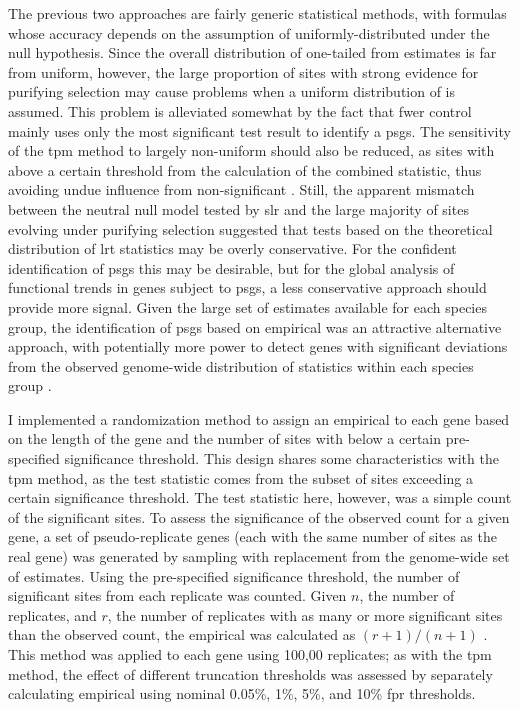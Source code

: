 The previous two approaches are fairly generic statistical methods,
with formulas whose accuracy depends on the assumption of
uniformly-distributed \pvs under the null hypothesis. Since the
overall distribution of one-tailed \pvs from \sw estimates is far
from uniform, however, the large proportion of sites with strong
evidence for purifying selection may cause problems when a uniform
distribution of \pvs is assumed. This problem is alleviated
somewhat by the fact that \ac{fwer} control mainly uses only the most
significant test result to identify a \acp{psg}. The sensitivity of
the \ac{tpm} method to largely non-uniform \pvs should also be
reduced, as sites with \pvs above a certain threshold from the
calculation of the combined statistic, thus avoiding undue influence
from non-significant \pvs. Still, the apparent mismatch between
the neutral null model tested by \ac{slr} and the large majority of
sites evolving under purifying selection suggested that tests based on
the theoretical distribution of \ac{lrt} statistics may be overly
conservative. For the confident identification of \acp{psg} this may
be desirable, but for the global analysis of functional trends in
genes subject to \acp{psg}, a less conservative approach should
provide more signal. Given the large set of \sw estimates available
for each species group, the identification of \acp{psg} based on
empirical \pvs was an attractive alternative approach, with
potentially more power to detect genes with significant deviations
from the observed genome-wide distribution of \slrt statistics within
each species group \citep{Noble2009a}.

I implemented a randomization method to assign an empirical \pv to
each gene based on the length of the gene and the number of sites with
\pvs below a certain pre-specified significance threshold. This
design shares some characteristics with the \ac{tpm} method, as the
test statistic comes from the subset of sites exceeding a certain
significance threshold. The test statistic here, however, was a simple
count of the significant sites. To assess the significance of the
observed count for a given gene, a set of pseudo-replicate genes (each
with the same number of sites as the real gene) was generated by
sampling with replacement from the genome-wide set of \sw
estimates. Using the pre-specified significance threshold, the number
of significant sites from each replicate was counted. Given $n$, the
number of replicates, and $r$, the number of replicates with as many
or more significant sites than the observed count, the empirical
\pv was calculated as $(r+1) / (n+1)$ \citep{North2002}. This
method was applied to each gene using 100,00 replicates; as with the
\ac{tpm} method, the effect of different truncation thresholds was
assessed by separately calculating empirical \pvs using nominal
0.05\%, 1\%, 5\%, and 10\% \ac{fpr} thresholds.

